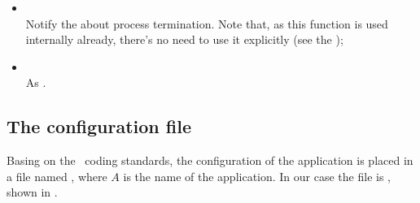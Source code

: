 \begin{enumerate}
\begin{itemize}
                \item {} \\
                    Notify the  about process termination.
                    Note that, as this function is used internally
                    already, there's no need to use it explicitly
                    (see the );

                \item {} \\
                    As .

                \end{itemize}
        \end{enumerate}


\subsection{The configuration file} \label{sub:ConfigurationFile}

Basing on the \Erlang\ coding standards, the configuration of the
application is placed in a file named , where $A$ is
the name of the application. In our case the file is ,
shown in .

